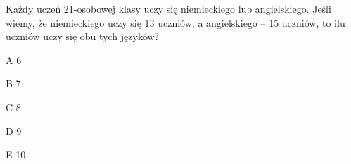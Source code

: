 \begin{tresc}
Każdy uczeń 21-osobowej klasy uczy się niemieckiego lub angielskiego. Jeśli wiemy, że niemieckiego uczy się 13 uczniów, a angielskiego – 15 uczniów, to ilu uczniów uczy się obu tych języków?
\end{tresc}
\begin{wariant}{A} 6 \end{wariant}
\begin{wariant}{B} 7 \end{wariant}
\begin{wariant}{C} 8 \end{wariant}
\begin{wariant}{D} 9 \end{wariant}
\begin{wariant}{E} 10 \end{wariant}
